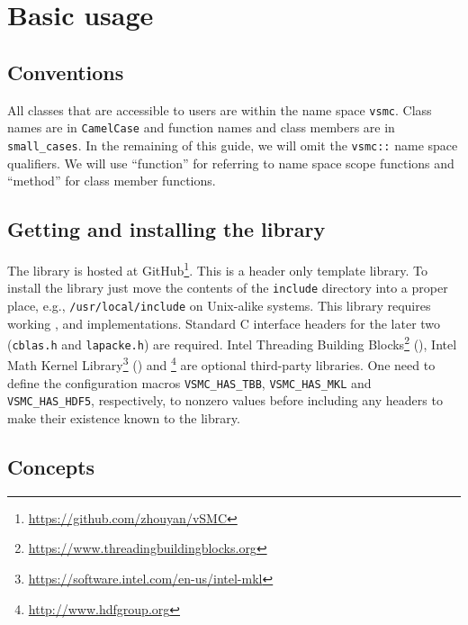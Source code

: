 \chapter{Basic usage}
\label{chap:Basic usage}

\section{Conventions}
\label{sec:Conventions}

All classes that are accessible to users are within the name space \verb|vsmc|.
Class names are in \verb|CamelCase| and function names and class members are in
\verb|small_cases|. In the remaining of this guide, we will omit the
\verb|vsmc::| name space qualifiers. We will use ``function'' for referring to
name space scope functions and ``method'' for class member functions.

\section{Getting and installing the library}
\label{sec:Getting and installing the library}

The library is hosted at
GitHub\footnote{\url{https://github.com/zhouyan/vSMC}}. This is a header only
\cpp template library. To install the library just move the contents of the
\verb|include| directory into a proper place, e.g., \verb|/usr/local/include|
on Unix-alike systems. This library requires working \cppoo, \blas and \lapack
implementations. Standard C interface headers for the later two (\verb|cblas.h|
and \verb|lapacke.h|) are required. Intel Threading Building
Blocks\footnote{\url{https://www.threadingbuildingblocks.org}} (\tbb), Intel
Math Kernel Library\footnote{\url{https://software.intel.com/en-us/intel-mkl}}
(\mkl) and \hdf\footnote{\url{http://www.hdfgroup.org}} are optional
third-party libraries. One need to define the configuration macros
\verb|VSMC_HAS_TBB|, \verb|VSMC_HAS_MKL| and \verb|VSMC_HAS_HDF5|,
respectively, to nonzero values before including any \vsmc headers to make
their existence known to the library.

\section{Concepts}
\label{sec:Concepts}

